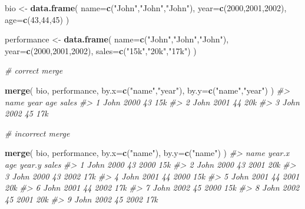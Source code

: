\documentclass[]{book}
\newenvironment{Shaded}{\begin{snugshade}}{\end{snugshade}}
\newcommand{\CommentTok}[1]{\textcolor[rgb]{0.56,0.35,0.01}{\textit{#1}}}
\newcommand{\DataTypeTok}[1]{\textcolor[rgb]{0.13,0.29,0.53}{#1}}
\newcommand{\DecValTok}[1]{\textcolor[rgb]{0.00,0.00,0.81}{#1}}
\newcommand{\KeywordTok}[1]{\textcolor[rgb]{0.13,0.29,0.53}{\textbf{#1}}}
\newcommand{\NormalTok}[1]{#1}
\newcommand{\StringTok}[1]{\textcolor[rgb]{0.31,0.60,0.02}{#1}}
\theoremstyle{definition}
\theoremstyle{definition}
\theoremstyle{definition}
\theoremstyle{remark}
\begin{document}
\begin{Shaded}
\begin{Highlighting}[]

\NormalTok{bio <-}\StringTok{ }\KeywordTok{data.frame}\NormalTok{( }\DataTypeTok{name=}\KeywordTok{c}\NormalTok{(}\StringTok{"John"}\NormalTok{,}\StringTok{"John"}\NormalTok{,}\StringTok{"John"}\NormalTok{),}
                   \DataTypeTok{year=}\KeywordTok{c}\NormalTok{(}\DecValTok{2000}\NormalTok{,}\DecValTok{2001}\NormalTok{,}\DecValTok{2002}\NormalTok{),}
                   \DataTypeTok{age=}\KeywordTok{c}\NormalTok{(}\DecValTok{43}\NormalTok{,}\DecValTok{44}\NormalTok{,}\DecValTok{45}\NormalTok{) )}

\NormalTok{performance <-}\StringTok{ }\KeywordTok{data.frame}\NormalTok{( }\DataTypeTok{name=}\KeywordTok{c}\NormalTok{(}\StringTok{"John"}\NormalTok{,}\StringTok{"John"}\NormalTok{,}\StringTok{"John"}\NormalTok{),}
                           \DataTypeTok{year=}\KeywordTok{c}\NormalTok{(}\DecValTok{2000}\NormalTok{,}\DecValTok{2001}\NormalTok{,}\DecValTok{2002}\NormalTok{),}
                           \DataTypeTok{sales=}\KeywordTok{c}\NormalTok{(}\StringTok{"15k"}\NormalTok{,}\StringTok{"20k"}\NormalTok{,}\StringTok{"17k"}\NormalTok{) )}

\CommentTok{# correct merge}

\KeywordTok{merge}\NormalTok{( bio, performance, }\DataTypeTok{by.x=}\KeywordTok{c}\NormalTok{(}\StringTok{"name"}\NormalTok{,}\StringTok{"year"}\NormalTok{), }\DataTypeTok{by.y=}\KeywordTok{c}\NormalTok{(}\StringTok{"name"}\NormalTok{,}\StringTok{"year"}\NormalTok{) ) }
\CommentTok{#>   name year age sales}
\CommentTok{#> 1 John 2000  43   15k}
\CommentTok{#> 2 John 2001  44   20k}
\CommentTok{#> 3 John 2002  45   17k}


\CommentTok{# incorrect merge}

\KeywordTok{merge}\NormalTok{( bio, performance, }\DataTypeTok{by.x=}\KeywordTok{c}\NormalTok{(}\StringTok{"name"}\NormalTok{), }\DataTypeTok{by.y=}\KeywordTok{c}\NormalTok{(}\StringTok{"name"}\NormalTok{) )  }
\CommentTok{#>   name year.x age year.y sales}
\CommentTok{#> 1 John   2000  43   2000   15k}
\CommentTok{#> 2 John   2000  43   2001   20k}
\CommentTok{#> 3 John   2000  43   2002   17k}
\CommentTok{#> 4 John   2001  44   2000   15k}
\CommentTok{#> 5 John   2001  44   2001   20k}
\CommentTok{#> 6 John   2001  44   2002   17k}
\CommentTok{#> 7 John   2002  45   2000   15k}
\CommentTok{#> 8 John   2002  45   2001   20k}
\CommentTok{#> 9 John   2002  45   2002   17k}
\end{Highlighting}
\end{Shaded}
\end{document}
